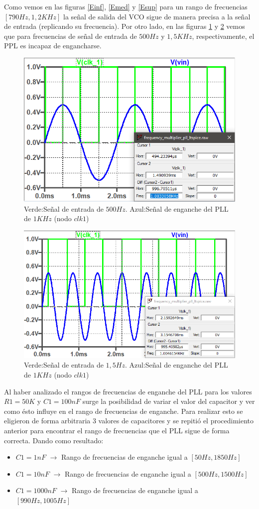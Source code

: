 \documentclass[10pt,a4paper]{IEEEtran}
\begin{document}
Como vemos en las figuras \ref{Einf}, \ref{Emed} y \ref{Esup} para un rango de frecuencias $[790Hz,1,2KHz]$ la señal de salida del VCO 
sigue de manera precisa a la señal de entrada (replicando su frecuencia). Por otro lado, en las figuras \ref{NEinf} y \ref{NEsup} vemos que para frecuencias de señal
de entrada de $500Hz$ y $1,5KHz$, respectivamente, el PPL es incapaz de engancharse.
\begin{figure}[H]
    \centering
    \includegraphics[width=.45\textwidth]{Fig/NoEnganche500}
    \caption{Verde:Señal de entrada de $500Hz$. Azul:Señal de enganche del PLL de $1KHz$ (nodo $clk1$)}
    \label{NEinf}
\end{figure}
\begin{figure}[H]
    \centering
    \includegraphics[width=.45\textwidth]{Fig/NoEnganche1500}
    \caption{Verde:Señal de entrada de $1,5Hz$. Azul:Señal de enganche del PLL de $1KHz$ (nodo $clk1$)}
    \label{NEsup}
\end{figure}
Al haber analizado el rangos de frecuencias de enganche del PLL para los valores $R1=50K$ y $C1=100nF$ surge la posibilidad de variar el valor del capacitor 
y ver como ésto influye en el rango de frecuencias de enganche. Para realizar esto se eligieron de forma arbitraria 3 valores de capacitores y se repitió el procedimiento anterior 
para encontrar el rango de frecuencias que el PLL sigue de forma correcta. Dando como resultado:
\begin{itemize}
    \item $C1=1nF$ $\rightarrow$ Rango de frecuencias de enganche igual a $[50Hz,1850Hz]$
    \item $C1=10nF$ $\rightarrow$ Rango de frecuencias de enganche igual a $[500Hz,1500Hz]$
    \item $C1=1000nF$ $\rightarrow$ Rango de frecuencias de enganche igual a $[990Hz,1005Hz]$
\end{itemize}
\end{document}
